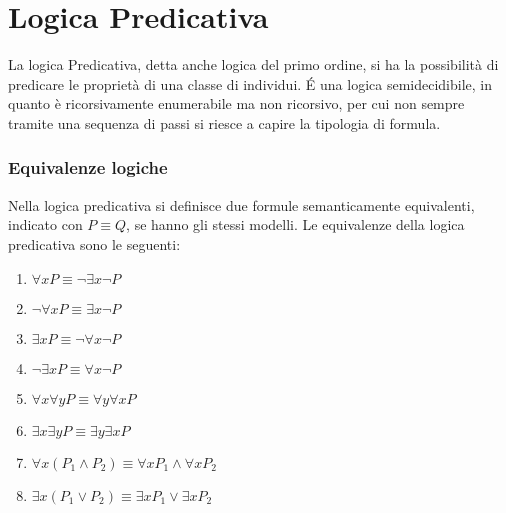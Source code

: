 \chapter{Logica Predicativa}
La logica Predicativa, detta anche logica del primo ordine, si ha la possibilità
di predicare le proprietà di una classe di individui.\newline
É una logica semidecidibile, in quanto è ricorsivamente enumerabile ma non ricorsivo,
per cui non sempre tramite una sequenza di passi si riesce a capire la tipologia di formula.







\subsection{Equivalenze logiche}
Nella logica predicativa si definisce due formule semanticamente equivalenti,
indicato con $P \equiv Q$, se hanno gli stessi modelli.
Le equivalenze della logica predicativa sono le seguenti:
\begin{enumerate}
    \item $\forall x P \equiv \neg \exists x \neg P$
    \item $\neg \forall x P \equiv \exists x \neg P$
    \item $\exists x P \equiv \neg \forall x \neg P$
    \item $\neg \exists x P \equiv \forall x \neg P$
    \item $\forall x \forall y P \equiv \forall y \forall x P$
    \item $\exists x \exists y P \equiv \exists y \exists x P$
    \item $\forall x(P_1 \land P_2) \equiv \forall x P_1 \land \forall x P_2$
    \item $\exists x(P_1 \lor P_2) \equiv \exists x P_1 \lor \exists x P_2$
\end{enumerate}





